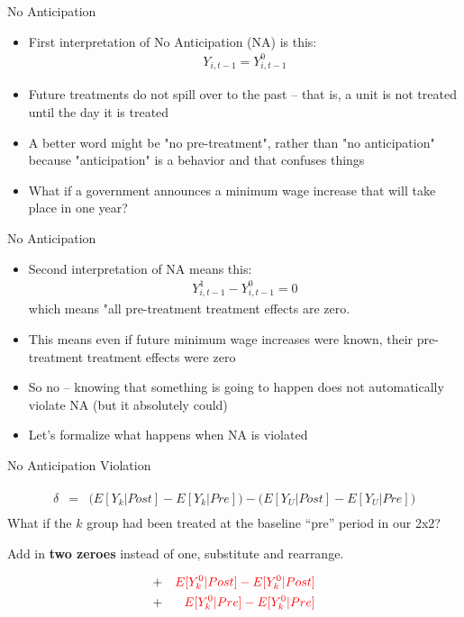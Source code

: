 \documentclass{beamer}
\begin{document}
\begin{frame}{No Anticipation}

\begin{itemize}
\item First interpretation of No Anticipation (NA) is this:
	\begin{eqnarray*}
	Y_{i,t-1}=Y^0_{i,t-1} 
	\end{eqnarray*}
\item Future treatments do not spill over to the past -- that is, a unit is not treated until the day it is treated
\item A better word might be "no pre-treatment", rather than "no anticipation" because "anticipation" is a behavior and that confuses things
\item What if a government announces a minimum wage increase that will take place in one year?

\end{itemize}

\end{frame}

\begin{frame}{No Anticipation}

\begin{itemize}
\item Second interpretation of NA means this:
	\begin{eqnarray*}
	Y^1_{i,t-1} - Y^0_{i,t-1}=0
	\end{eqnarray*}which means "all pre-treatment treatment effects are zero.  
\item This means even if future minimum wage increases were known, their pre-treatment treatment effects were zero
\item So no -- knowing that something is going to happen does not automatically violate NA (but it absolutely could)
\item Let's formalize what happens when NA is violated

\end{itemize}

\end{frame}




\begin{frame}{No Anticipation Violation}


\begin{eqnarray*}
\widehat{\delta} &=& \bigg ( E[Y_k|Post] - E[Y_k|Pre] \bigg ) - \bigg ( E[Y_U | Post ] - E[ Y_U | Pre] \bigg) \\
\end{eqnarray*}What if the $k$ group had been treated at the baseline ``pre'' period in our 2x2?  

\bigskip

Add in \textbf{two zeroes} instead of one, substitute and rearrange.

\begin{eqnarray*}
&+& \textcolor{red}{E[Y^0_k|Post] - E[Y^0_k|Post]} \\
&+& \textcolor{red}{E[Y^0_k|Pre] - E[Y^0_k|Pre]} 
\end{eqnarray*}

\end{frame}
\end{document}
